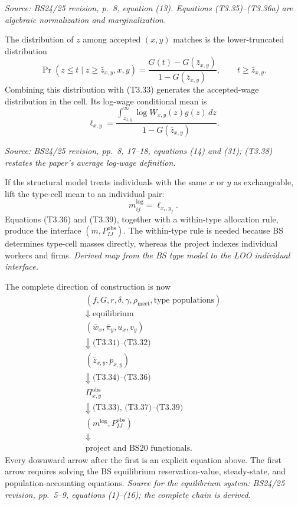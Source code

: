 \documentclass[11pt]{article}
\begin{document}
\textit{Source: BS24/25 revision, p.\ 8, equation (13).  Equations
(T3.35)--(T3.36a) are algebraic normalization and marginalization.}

The distribution of \(z\) among accepted \((x,y)\) matches is the lower-truncated
distribution
\[
\Pr(z\leq t\mid z\geq\bar z_{x,y},x,y)
=
\frac{G(t)-G(\bar z_{x,y})}
{1-G(\bar z_{x,y})},
\qquad t\geq\bar z_{x,y}.
\tag{T3.37}
\]
Combining this distribution with (T3.33) generates the accepted-wage
distribution in the cell.  Its log-wage conditional mean is
\[
\ell_{x,y}
=
\frac{
\displaystyle\int_{\bar z_{x,y}}^\infty
\log W_{x,y}(z)g(z)\,dz}
{1-G(\bar z_{x,y})}.
\tag{T3.38}
\]

\textit{Source: BS24/25 revision, pp.\ 8, 17--18, equations (14) and (31);
(T3.38) restates the paper's average log-wage definition.}

If the structural model treats individuals with the same \(x\) or \(y\) as
exchangeable, lift the type-cell mean to an individual pair:
\[
m^{\log}_{ij}=\ell_{x_i,y_j}.
\tag{T3.39}
\]
Equations (T3.36) and (T3.39), together with a within-type allocation rule,
produce the interface \((m,P^{\mathrm{obs}}_{IJ})\).  The within-type rule is
needed because BS determines type-cell masses directly, whereas the project
indexes individual workers and firms.
\textit{Derived map from the BS type model to the LOO individual interface.}

The complete direction of construction is now
\[
\begin{array}{c}
(f,G,r,\delta,\gamma,\rho_{\mathrm{meet}},\text{type populations})\\
\Downarrow\ \text{equilibrium}\\
(\bar w_x,\bar\pi_y,u_x,v_y)\\
\Downarrow\ \text{(T3.31)--(T3.32)}\\
(\bar z_{x,y},p_{x,y})\\
\Downarrow\ \text{(T3.34)--(T3.36)}\\
\Pi^{\mathrm{obs}}_{x,y}\\
\Downarrow\ \text{(T3.33), (T3.37)--(T3.39)}\\
(m^{\log},P^{\mathrm{obs}}_{IJ})\\
\Downarrow\\
\text{project and BS20 functionals}.
\end{array}
\tag{T3.40}
\]
Every downward arrow after the first is an explicit equation above.  The first
arrow requires solving the BS equilibrium reservation-value, steady-state,
and population-accounting equations.
\textit{Source for the equilibrium system: BS24/25 revision, pp.\ 5--9,
equations (1)--(16); the complete chain is derived.}
\end{document}
